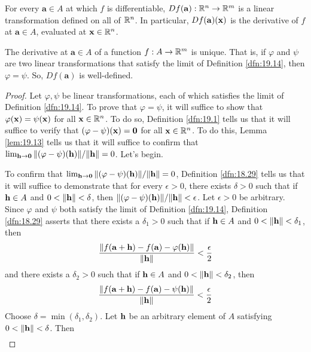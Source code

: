 \documentclass[../main.tex]{subfiles}
\begin{document}
\begin{remark}\label{rmk:19.15}
    For every $\mathbf{a}\in A$ at which $f$ is differentiable, $Df(\mathbf{a}):\mathbb{R}^n\to\mathbb{R}^m$ is a linear transformation defined on all of $\mathbb{R}^n$. In particular, $Df(\mathbf{a})(\mathbf{x})$ is the derivative of $f$ at $\mathbf{a}\in A$, evaluated at $\mathbf{x}\in\mathbb{R}^n$.
\end{remark}

\begin{proposition}\label{prp:19.16}
    The derivative at $\mathbf{a}\in A$ of a function $f:A\to\mathbb{R}^m$ is unique. That is, if $\varphi$ and $\psi$ are two linear transformations that satisfy the limit of Definition \ref{dfn:19.14}, then $\varphi=\psi$. So, $Df(\mathbf{a})$ is well-defined.
    \begin{proof}
        Let $\varphi,\psi$ be linear transformations, each of which satisfies the limit of Definition \ref{dfn:19.14}. To prove that $\varphi=\psi$, it will suffice to show that $\varphi(\mathbf{x})=\psi(\mathbf{x})$ for all $\mathbf{x}\in\mathbb{R}^n$. To do so, Definition \ref{dfn:19.1} tells us that it will suffice to verify that $(\varphi-\psi)(\mathbf{x})=\mathbf{0}$ for all $\mathbf{x}\in\mathbb{R}^n$. To do this, Lemma \ref{lem:19.13} tells us that it will suffice to confirm that $\lim_{\mathbf{h}\to\mathbf{0}}\norm{(\varphi-\psi)(\mathbf{h})}/\norm{\mathbf{h}}=0$. Let's begin.\par
        To confirm that $\lim_{\mathbf{h}\to\mathbf{0}}\norm{(\varphi-\psi)(\mathbf{h})}/\norm{\mathbf{h}}=0$, Definition \ref{dfn:18.29} tells us that it will suffice to demonstrate that for every $\epsilon>0$, there exists $\delta>0$ such that if $\mathbf{h}\in A$ and $0<\norm{\mathbf{h}}<\delta$, then $\norm{(\varphi-\psi)(\mathbf{h})}/\norm{\mathbf{h}}<\epsilon$. Let $\epsilon>0$ be arbitrary. Since $\varphi$ and $\psi$ both satisfy the limit of Definition \ref{dfn:19.14}, Definition \ref{dfn:18.29} asserts that there exists a $\delta_1>0$ such that if $\mathbf{h}\in A$ and $0<\norm{\mathbf{h}}<\delta_1$, then
        \begin{equation*}
            \frac{\norm{f(\mathbf{a}+\mathbf{h})-f(\mathbf{a})-\varphi(\mathbf{h})}}{\norm{\mathbf{h}}} < \frac{\epsilon}{2}
        \end{equation*}
        and there exists a $\delta_2>0$ such that if $\mathbf{h}\in A$ and $0<\norm{\mathbf{h}}<\delta_2$, then
        \begin{equation*}
            \frac{\norm{f(\mathbf{a}+\mathbf{h})-f(\mathbf{a})-\psi(\mathbf{h})}}{\norm{\mathbf{h}}} < \frac{\epsilon}{2}
        \end{equation*}
        Choose $\delta=\min(\delta_1,\delta_2)$. Let $\mathbf{h}$ be an arbitrary element of $A$ satisfying $0<\norm{\mathbf{h}}<\delta$. Then
        \begin{align*}

\end{align*}
\end{proof}
\end{proposition}
\end{document}
